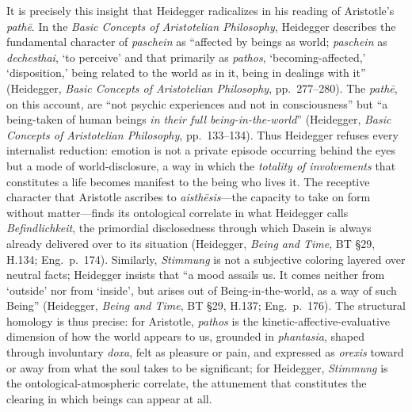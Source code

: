 \documentclass{article}
\begin{document}
It is precisely this insight that Heidegger radicalizes in his reading of Aristotle's \textit{pathē}. In the \textit{Basic Concepts of Aristotelian Philosophy}, Heidegger describes the fundamental character of \textit{paschein} as ``affected by beings as world; \textit{paschein} as \textit{dechesthai}, `to perceive' and that primarily as \textit{pathos}, `becoming-affected,' `disposition,' being related to the world as in it, being in dealings with it'' (Heidegger, \textit{Basic Concepts of Aristotelian Philosophy}, pp.~277--280). The \textit{pathē}, on this account, are ``not psychic experiences and not in consciousness'' but ``a being-taken of human beings \textit{in their full being-in-the-world}'' (Heidegger, \textit{Basic Concepts of Aristotelian Philosophy}, pp.~133--134). Thus Heidegger refuses every internalist reduction: emotion is not a private episode occurring behind the eyes but a mode of world-disclosure, a way in which the \textit{totality of involvements} that constitutes a life becomes manifest to the being who lives it. The receptive character that Aristotle ascribes to \textit{aisthēsis}---the capacity to take on form without matter---finds its ontological correlate in what Heidegger calls \textit{Befindlichkeit}, the primordial disclosedness through which Dasein is always already delivered over to its situation (Heidegger, \textit{Being and Time}, BT \S29, H.134; Eng.~p.~174). Similarly, \textit{Stimmung} is not a subjective coloring layered over neutral facts; Heidegger insists that ``a mood assails us. It comes neither from `outside' nor from `inside', but arises out of Being-in-the-world, as a way of such Being'' (Heidegger, \textit{Being and Time}, BT \S29, H.137; Eng.~p.~176). The structural homology is thus precise: for Aristotle, \textit{pathos} is the kinetic-affective-evaluative dimension of how the world appears to us, grounded in \textit{phantasia}, shaped through involuntary \textit{doxa}, felt as pleasure or pain, and expressed as \textit{orexis} toward or away from what the soul takes to be significant; for Heidegger, \textit{Stimmung} is the ontological-atmospheric correlate, the attunement that constitutes the clearing in which beings can appear at all.
\end{document}
